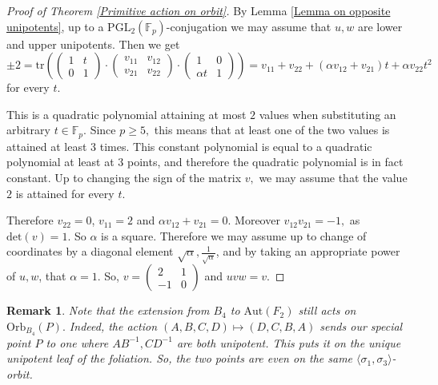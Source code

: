 \documentclass[letterpaper]{amsart}
\newtheorem{remark}[theorem]{Remark}
\begin{document}
\begin{proof}[Proof of Theorem \ref{Primitive action on orbit}]
    By Lemma \ref{Lemma on opposite unipotents}, up to a $\mathrm{PGL}_2(\mathbb{F}_p)$-conjugation we may assume that $u,w$ are lower and upper unipotents. Then we get $$\pm 2 = \mathrm{tr}\left(\begin{pmatrix}1 & t \\ 0 & 1\end{pmatrix} \cdot \begin{pmatrix}v_{11} & v_{12} \\ v_{21} & v_{22}\end{pmatrix} \cdot \begin{pmatrix}1 & 0 \\ \alpha t & 1\end{pmatrix}\right) = v_{11} + v_{22} + (\alpha v_{12} + v_{21})t + \alpha v_{22}t^2$$ for every $t.$

    This is a quadratic polynomial attaining at most $2$ values when substituting an arbitrary $t \in \mathbb{F}_p.$ Since $p \geq 5,$ this means that at least one of the two values is attained at least $3$ times. This constant polynomial is equal to a quadratic polynomial at least at $3$ points, and therefore the quadratic polynomial is in fact constant. Up to changing the sign of the matrix $v,$ we may assume that the value $2$ is attained for every $t.$

    Therefore $v_{22} = 0$, $v_{11} = 2$ and $\alpha v_{12} + v_{21} = 0.$ Moreover $v_{12}v_{21} = -1,$ as $\mathrm{det}(v) = 1.$ So $\alpha$ is a square. Therefore we may assume up to change of coordinates by a diagonal element $\sqrt{\alpha},\frac{1}{\sqrt{\alpha}}$, and by taking an appropriate power of $u, w$, that $\alpha = 1$. So, $v = \begin{pmatrix}2 & 1 \\ -1 & 0\end{pmatrix}$ and $uvw = v$.
\end{proof}

\begin{remark}
\label{Remark on AutF2 extension}
    Note that the extension from $B_4$ to $\mathrm{Aut}(F_2)$ still acts on $\mathrm{Orb}_{B_4}(P).$ Indeed, the action $(A,B,C,D)\mapsto (D,C,B,A)$ sends our special point $P$ to one where $AB^{-1},CD^{-1}$ are both unipotent. This puts it on the unique unipotent leaf of the foliation. So, the two points are even on the same $\langle\sigma_1,\sigma_3\rangle$-orbit.
\end{remark}
\end{document}
